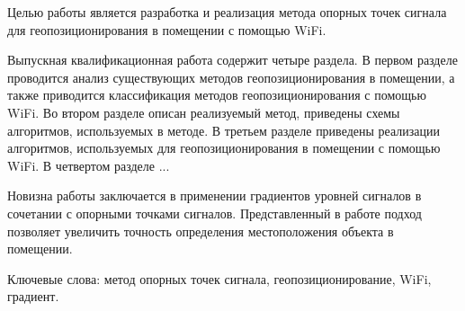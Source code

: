 \begin{essay}{}

    Целью работы является разработка и реализация метода опорных точек сигнала для геопозиционирования в помещении с помощью WiFi.

    Выпускная квалификационная работа содержит четыре раздела. В первом разделе проводится анализ существующих методов геопозиционирования в помещении, а также приводится классификация методов геопозиционирования с помощью WiFi. Во втором разделе описан реализуемый метод, приведены схемы алгоритмов, используемых в методе. В третьем разделе приведены реализации алгоритмов, используемых для геопозиционирования в помещении с помощью WiFi. В четвертом разделе ...

    Новизна работы заключается в применении градиентов уровней сигналов в сочетании с опорными точками сигналов. Представленный в работе подход позволяет увеличить точность определения местоположения объекта в помещении.

    Ключевые слова: метод опорных точек сигнала, геопозиционирование, WiFi, градиент.

\end{essay}